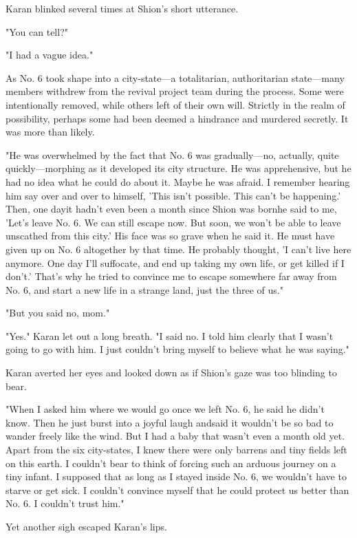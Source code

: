 Karan blinked several times at Shion's short utterance.

"You can tell?"

"I had a vague idea."

As No. 6 took shape into a city-state---a totalitarian, authoritarian
state---many members withdrew from the revival project team during the
process. Some were intentionally removed, while others left of their own
will. Strictly in the realm of possibility, perhaps some had been deemed
a hindrance and murdered secretly. It was more than likely.

"He was overwhelmed by the fact that No. 6 was gradually---no, actually,
quite quickly---morphing as it developed its city structure. He was
apprehensive, but he had no idea what he could do about it. Maybe he was
afraid. I remember hearing him say over and over to himself, 'This isn't
possible. This can't be happening.' Then, one day\el it hadn't even been
a month since Shion was born\el he said to me, 'Let's leave No. 6. We
can still escape now. But soon, we won't be able to leave unscathed from
this city.' His face was so grave when he said it. He must have given up
on No. 6 altogether by that time. He probably thought, 'I can't live
here anymore. One day I'll suffocate, and end up taking my own life, or
get killed if I don't.' That's why he tried to convince me to escape
somewhere far away from No. 6, and start a new life in a strange land,
just the three of us."

"But you said no, mom."

"Yes." Karan let out a long breath. "I said no. I told him clearly that
I wasn't going to go with him. I just couldn't bring myself to believe
what he was saying."

Karan averted her eyes and looked down as if Shion's gaze was too
blinding to bear.

"When I asked him where we would go once we left No. 6, he said he
didn't know. Then he just burst into a joyful laugh and\el said it
wouldn't be so bad to wander freely like the wind. But I had a baby that
wasn't even a month old yet. Apart from the six city-states, I knew
there were only barrens and tiny fields left on this earth. I couldn't
bear to think of forcing such an arduous journey on a tiny infant. I
supposed that as long as I stayed inside No. 6, we wouldn't have to
starve or get sick. I couldn't convince myself that he could protect us
better than No. 6. I couldn't trust him."

Yet another sigh escaped Karan's lips.

